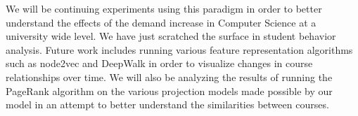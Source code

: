 \documentclass{sigchi}
\begin{document}
We will be continuing experiments using this paradigm in order to better understand the effects of the demand increase in Computer Science at a university wide level. We have just scratched the surface in student behavior analysis. Future work includes running various feature representation algorithms such as node2vec and DeepWalk in order to visualize changes in course relationships over time. We will also be analyzing the results of running the PageRank algorithm on the various projection models made possible by our model in an attempt to better understand the similarities between courses.

\balance{}


\end{document}
